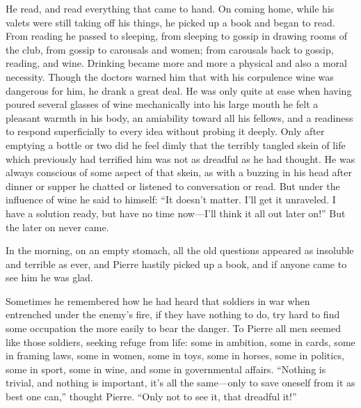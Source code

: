He read, and read everything that came to hand. On coming home,
while his valets were still taking off his things, he picked up a
book and began to read. From reading he passed to sleeping, from
sleeping to gossip in drawing rooms of the club, from gossip to
carousals and women; from carousals back to gossip, reading, and
wine. Drinking became more and more a physical and also a moral
necessity. Though the doctors warned him that with his corpulence
wine was dangerous for him, he drank a great deal. He was only
quite at ease when having poured several glasses of wine
mechanically into his large mouth he felt a pleasant warmth in
his body, an amiability toward all his fellows, and a readiness
to respond superficially to every idea without probing it
deeply. Only after emptying a bottle or two did he feel dimly
that the terribly tangled skein of life which previously had
terrified him was not as dreadful as he had thought. He was
always conscious of some aspect of that skein, as with a buzzing
in his head after dinner or supper he chatted or listened to
conversation or read. But under the influence of wine he said to
himself: ``It doesn't matter. I'll get it unraveled. I have a
solution ready, but have no time now---I'll think it all out
later on!'' But the later on never came.

In the morning, on an empty stomach, all the old questions
appeared as insoluble and terrible as ever, and Pierre hastily
picked up a book, and if anyone came to see him he was glad.

Sometimes he remembered how he had heard that soldiers in war
when entrenched under the enemy's fire, if they have nothing to
do, try hard to find some occupation the more easily to bear the
danger. To Pierre all men seemed like those soldiers, seeking
refuge from life: some in ambition, some in cards, some in
framing laws, some in women, some in toys, some in horses, some
in politics, some in sport, some in wine, and some in
governmental affairs. ``Nothing is trivial, and nothing is
important, it's all the same---only to save oneself from it as
best one can,'' thought Pierre. ``Only not to see it, that
dreadful it!''


